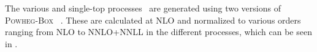 {The various \ttbar and single-top processes~\cite{ATL-PHYS-PUB-2016-004} are generated using two versions of \textsc{Powheg-Box} ~\cite{ATL-PHYS-PUB-2016-004,powheg-box}.
These are calculated at NLO and normalized to various orders ranging from NLO to NNLO+NNLL in the different processes, which can be seen in \cite{Czakon:2013goa,Czakon:2011xx,Aliev:2010zk,Kant:2014oha,Kidonakis:2010ux,Kidonakis:2011wy}.

}
